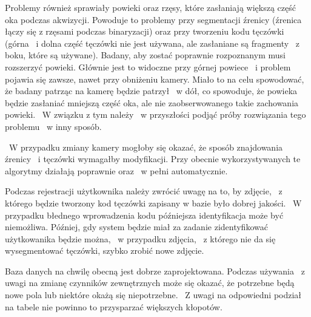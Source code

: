Problemy również sprawiały powieki oraz rzęsy, które zasłaniają większą część oka podczas akwizycji. Powoduje to problemy przy segmentacji źrenicy (źrenica łączy się z rzęsami podczas binaryzacji) oraz przy tworzeniu kodu tęczówki (górna ~i dolna część tęczówki nie jest używana, ale zasłaniane są fragmenty ~z boku, które są używane). Badany, aby zostać poprawnie rozpoznanym musi rozszerzyć powieki. Głównie jest to widoczne przy górnej powiece ~i problem pojawia się zawsze, nawet przy obniżeniu kamery. Miało to na celu spowodować, że badany patrząc na kamerę będzie patrzył ~w dół, co spowoduje, że powieka będzie zasłaniać mniejszą część oka, ale nie zaobserwowanego takie zachowania powieki. ~W związku z tym należy ~w przyszłości podjąć próby rozwiązania tego problemu ~w inny sposób.

~W przypadku zmiany kamery mogłoby się okazać, że sposób znajdowania źrenicy ~i tęczówki wymagałby modyfikacji. Przy obecnie wykorzystywanych te algorytmy działają poprawnie oraz ~w pełni automatycznie.

Podczas rejestracji użytkownika należy zwrócić uwagę na to, by zdjęcie, ~z którego będzie tworzony kod tęczówki zapisany w bazie było dobrej jakości. ~W przypadku błednego wprowadzenia kodu późniejsza identyfikacja może być niemożliwa. Później, gdy system będzie miał za zadanie zidentyfikować użytkowanika będzie można, ~w przypadku zdjęcia, ~z którego nie da się wysegmentować tęczówki, szybko zrobić nowe zdjęcie.

Baza danych na chwilę obecną jest dobrze zaprojektowana. Podczas używania ~z uwagi na zmianę czynników zewnętrznych może się okazać, że potrzebne będą nowe pola lub niektóre okażą się niepotrzebne. ~Z uwagi na odpowiedni podział na tabele nie powinno to przysparzać większych kłopotów.

